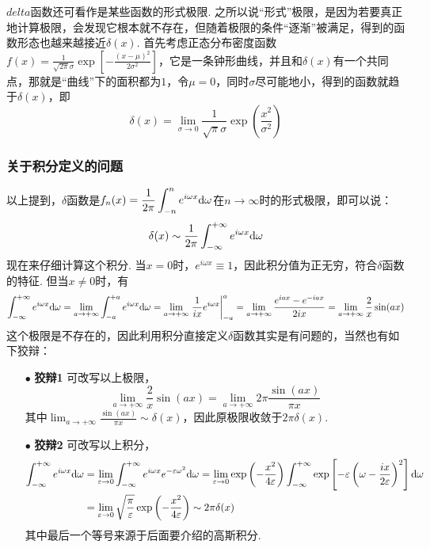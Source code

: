 \documentclass[main.tex]{subfiles}
\begin{document}
\(delta\)函数还可看作是某些函数的形式极限. 之所以说“形式”极限，是因为若要真正地计算极限，会发现它根本就不存在，但随着极限的条件“逐渐”被满足，得到的函数形态也越来越接近\(\delta(x)\). 首先考虑正态分布密度函数\(\displaystyle{f(x) = \frac{1}{\sqrt{2\pi}\sigma}\exp\left[-\frac{(x-\mu)^2}{2\sigma^2}\right]}\)，它是一条钟形曲线，并且和\(\delta(x)\)有一个共同点，那就是“曲线”下的面积都为\(1\)，令\(\mu=0\)，同时\(\sigma\)尽可能地小，得到的函数就趋于\(\delta(x)\)，即
\[\delta(x) = \lim_{\sigma \to 0} \frac{1}{\sqrt{\pi}\sigma}\exp\left(\frac{x^2}{\sigma^2}\right)\]

\subsubsection{关于积分定义的问题}

以上提到，\(\delta\)函数是\(\displaystyle{f_n(x) = \frac{1}{2\pi}\int_{-n}^{n}e^{i\omega x}{\rm d}\omega}\)在\(n \to \infty\)时的形式极限，即可以说：
\[\delta(x) \sim \frac{1}{2\pi}\int_{-\infty}^{+\infty}e^{i\omega x}{\rm d}\omega\]
现在来仔细计算这个积分. 当\(x=0\)时，\(e^{i\omega x} \equiv 1\)，因此积分值为正无穷，符合\(\delta\)函数的特征. 但当\(x \neq 0\)时，有
\[\int_{-\infty}^{+\infty}e^{i\omega x}{\rm d}\omega = \lim_{a \to +\infty} \int_{-a}^{+a}e^{i\omega x}{\rm d}\omega = \lim_{a \to +\infty}\left.\frac{1}{ix}e^{i\omega x}\right|_{-a}^{a} = \lim_{a \to +\infty}\frac{e^{iax}-e^{-iax}}{2ix} = \lim_{a \to +\infty}\frac{2}{x}\sin(ax)\]
这个极限是不存在的，因此利用积分直接定义\(\delta\)函数其实是有问题的，当然也有如下狡辩：
\begin{itemize}
    \item [\(\bullet\)] \textbf{狡辩1} 可改写以上极限，
    \[\lim_{a \to +\infty}\frac{2}{x}\sin(ax) = \lim_{a \to +\infty}2\pi \frac{\sin(ax)}{\pi x}\] 
    其中\(\displaystyle{\lim_{a \to +\infty}\frac{\sin(ax)}{\pi x} \sim \delta(x)}\)，因此原极限收敛于\(2\pi\delta(x)\).
    \item[\(\bullet\)] \textbf{狡辩2} 可改写以上积分，
    \begin{align*}
        \int_{-\infty}^{+\infty}e^{i\omega x}{\rm d}\omega &= \lim_{\varepsilon \to 0}\int_{-\infty}^{+\infty}e^{i\omega x}e^{-\varepsilon\omega^2}{\rm d}\omega = \lim_{\varepsilon \to 0}\exp\left(-\frac{x^2}{4\varepsilon}\right)\int_{-\infty}^{+\infty}\exp\left[-\varepsilon\left(\omega-\frac{ix}{2\varepsilon}\right)^2\right]{\rm d}\omega \\
        &= \lim_{\varepsilon \to 0}\sqrt{\frac{\pi}{\varepsilon}}\exp\left(-\frac{x^2}{4\varepsilon}\right) \sim 2\pi \delta(x)
    \end{align*}
    其中最后一个等号来源于后面要介绍的高斯积分.
\end{itemize}
\end{document}
